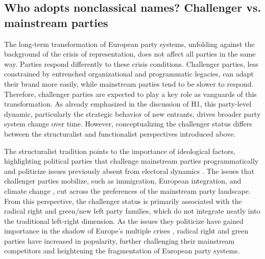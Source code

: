\documentclass[12pt]{article}
\begin{document}
\subsection{Who adopts nonclassical names? Challenger vs. mainstream parties}

The long-term transformation of European party systems, unfolding against the background of the crisis of representation, does not affect all parties in the same way. Parties respond differently to these crisis conditions. Challenger parties, less constrained by entrenched organizational and programmatic legacies, can adapt their brand more easily, while mainstream parties tend to be slower to respond. Therefore, challenger parties are expected to play a key role as vanguards of this transformation. As already emphasized in the discussion of H1, this party-level dynamic, particularly the strategic behavior of new entrants, drives broader party system change over time. However, conceptualizing the challenger status differs between the structuralist and functionalist perspectives introduced above.

The structuralist tradition points to the importance of ideological factors, highlighting political parties that challenge mainstream parties programmatically and politicize issues previously absent from electoral dynamics \citep{Hooghe_Marks_2018, Kriesi_et_al_2008}. The issues that challenger parties mobilize, such as immigration, European integration, and climate change \citep[][]{deVries_Hobolt_2020, de_Wilde_Koopmans_Merkel_Strijbis_Zurn_2019, Dickson_hobolt_2024}, cut across the preferences of the mainstream party landscape. From this perspective, the challenger status is primarily associated with the radical right and green/new left party families, which do not integrate neatly into the traditional left-right dimension. As the issues they politicize have gained importance in the shadow of Europe's multiple crises \citep{Hutter_Kriesi_2019, Hooghe_Marks_2018}, radical right and green parties have increased in popularity, further challenging their mainstream competitors and heightening the fragmentation of European party systems.
\end{document}
